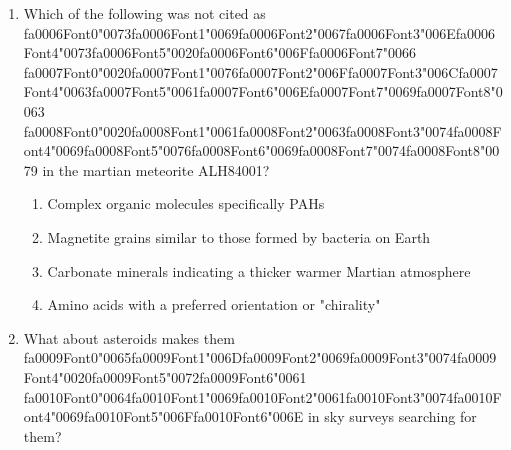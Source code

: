 \documentclass[12pt]{article}
\begin{document}
\begin{enumerate}[label=\arabic*.]
\begin{enumerate}[label=(\alph*)]
    \item ancient heavily cratered highlands
    \item dark lavas inside volcanic calderas
    \item dark lavas filling older impact basins
    \item the bright regions on the Moon
\end{enumerate}
\item Which of the following was not cited as {\csname fa0006Font0\endcsname\char"0073}{\csname fa0006Font1\endcsname\char"0069}{\csname fa0006Font2\endcsname\char"0067}{\csname fa0006Font3\endcsname\char"006E}{\csname fa0006Font4\endcsname\char"0073}{\csname fa0006Font5\endcsname\char"0020}{\csname fa0006Font6\endcsname\char"006F}{\csname fa0006Font7\endcsname\char"0066} {\csname fa0007Font0\endcsname\char"0020}{\csname fa0007Font1\endcsname\char"0076}{\csname fa0007Font2\endcsname\char"006F}{\csname fa0007Font3\endcsname\char"006C}{\csname fa0007Font4\endcsname\char"0063}{\csname fa0007Font5\endcsname\char"0061}{\csname fa0007Font6\endcsname\char"006E}{\csname fa0007Font7\endcsname\char"0069}{\csname fa0007Font8\endcsname\char"0063} {\csname fa0008Font0\endcsname\char"0020}{\csname fa0008Font1\endcsname\char"0061}{\csname fa0008Font2\endcsname\char"0063}{\csname fa0008Font3\endcsname\char"0074}{\csname fa0008Font4\endcsname\char"0069}{\csname fa0008Font5\endcsname\char"0076}{\csname fa0008Font6\endcsname\char"0069}{\csname fa0008Font7\endcsname\char"0074}{\csname fa0008Font8\endcsname\char"0079} in the martian meteorite
ALH84001?
\begin{enumerate}[label=(\alph*)]
    \item Complex organic molecules specifically PAHs
    \item Magnetite grains similar to those formed by bacteria on Earth
    \item Carbonate minerals indicating a thicker warmer Martian atmosphere
    \item Amino acids with a preferred orientation or "chirality"
\end{enumerate}
\item What about asteroids makes them {\csname fa0009Font0\endcsname\char"0065}{\csname fa0009Font1\endcsname\char"006D}{\csname fa0009Font2\endcsname\char"0069}{\csname fa0009Font3\endcsname\char"0074}{\csname fa0009Font4\endcsname\char"0020}{\csname fa0009Font5\endcsname\char"0072}{\csname fa0009Font6\endcsname\char"0061} {\csname fa0010Font0\endcsname\char"0064}{\csname fa0010Font1\endcsname\char"0069}{\csname fa0010Font2\endcsname\char"0061}{\csname fa0010Font3\endcsname\char"0074}{\csname fa0010Font4\endcsname\char"0069}{\csname fa0010Font5\endcsname\char"006F}{\csname fa0010Font6\endcsname\char"006E} in sky surveys searching for them?

\end{enumerate}
\end{document}
